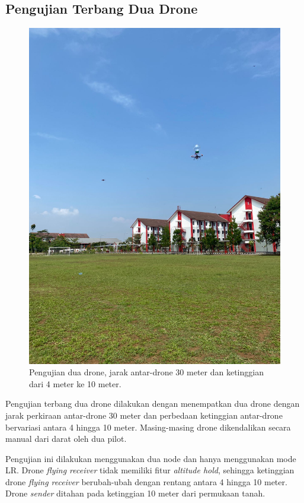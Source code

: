 \subsection{Pengujian Terbang Dua Drone}
\begin{figure}[H]
	\centering
	\includegraphics[scale=0.15]{./assets/Pengujian/PengujianDuaDrone/DuaDrone}
	\caption{Pengujian dua drone, jarak antar-drone 30 meter dan ketinggian dari 4 meter ke 10 meter.}
\end{figure}
Pengujian terbang dua drone dilakukan dengan menempatkan dua drone dengan jarak perkiraan antar-drone 30 meter dan perbedaan ketinggian antar-drone bervariasi antara 4 hingga 10 meter. Masing-masing drone dikendalikan secara manual dari darat oleh dua pilot.

Pengujian ini dilakukan menggunakan dua node dan hanya menggunakan mode LR. Drone \textit{flying receiver} tidak memiliki fitur \textit{altitude hold}, sehingga ketinggian drone \textit{flying receiver} berubah-ubah dengan rentang antara 4 hingga 10 meter. Drone \textit{sender} ditahan pada ketinggian 10 meter dari permukaan tanah.

